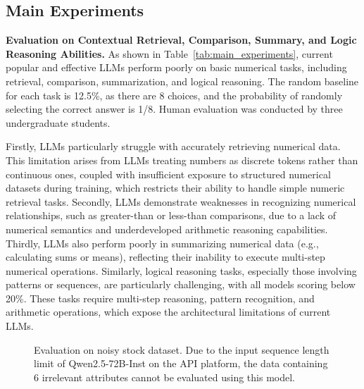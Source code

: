 \subsection{Main Experiments}
\noindent \textbf{Evaluation on Contextual Retrieval, Comparison, Summary, and Logic Reasoning Abilities.}
As shown in Table~\ref{tab:main_experiments}, 
current popular and effective LLMs perform poorly on basic numerical tasks, 
including retrieval, comparison, summarization, and logical reasoning. 
The random baseline for each task is 12.5\%, as there are 8 choices, and the probability of randomly selecting the correct answer is 1/8. 
Human evaluation was conducted by three undergraduate students. 

Firstly,
LLMs particularly struggle with accurately retrieving numerical data.
This limitation arises from LLMs treating numbers as discrete tokens rather than continuous ones, coupled with insufficient exposure to structured numerical datasets during training, which restricts their ability to handle simple numeric retrieval tasks. 
Secondly, LLMs demonstrate weaknesses in recognizing numerical relationships, such as greater-than or less-than comparisons, due to a lack of numerical semantics and underdeveloped arithmetic reasoning capabilities. 
Thirdly,
LLMs also perform poorly in summarizing numerical data (e.g., calculating sums or means), reflecting their inability to execute multi-step numerical operations. 
Similarly, logical reasoning tasks, especially those involving patterns or sequences, are particularly challenging, with all models scoring below 20\%. 
These tasks require multi-step reasoning, pattern recognition, and arithmetic operations, which expose the architectural limitations of current LLMs.









\begin{figure*}[t]
	\vspace{-2em}
	\centering 	
	\hfill
	\hfill
 
	\caption{Evaluation on noisy stock dataset. Due to the input sequence length limit of Qwen2.5-72B-Inst on the API platform, the data containing 6 irrelevant attributes cannot be evaluated using this model.}
	\label{fig:noisy_stock}
	
\end{figure*}




